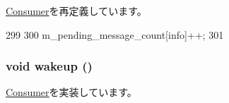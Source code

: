 \hyperlink{classConsumer_a6f82fdec6e5674ac2254f16b8fa82afb}{Consumer}を再定義しています。


\begin{DoxyCode}
299 {
300     m_pending_message_count[info]++;
301 }
\end{DoxyCode}
\hypertarget{classPerfectSwitch_ae674290a26ecbd622c5160e38e8a4fe9}{
\subsubsection[{wakeup}]{\setlength{\rightskip}{0pt plus 5cm}void wakeup ()}}
\label{classPerfectSwitch_ae674290a26ecbd622c5160e38e8a4fe9}


\hyperlink{classConsumer_a623e3e7d1b1c725d70009f7b01a421b9}{Consumer}を実装しています。


